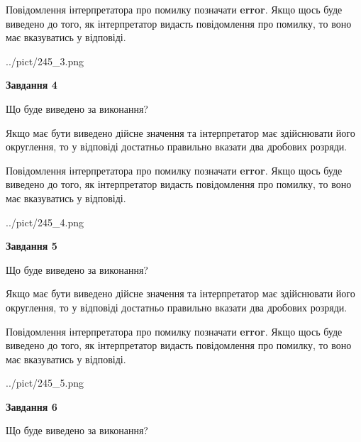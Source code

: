 \documentclass[12pt, ukrainian]{article}
\begin{document}
{\begin {Large}
Повідомлення інтерпретатора про помилку позначати \textbf{error}.
Якщо щось буде виведено до того, як інтерпретатор видасть повідомлення про помилку, 
то воно має вказуватись у відповіді. \par

\begin{center}
	{../pict/245_3.png}
\end{center}
\newpage

{\begin {center}\textbf{Завдання 4}\end {center}}\par
Що буде виведено за виконання? \par

Якщо має бути виведено дійсне значення та інтерпретатор має здійснювати його округлення, 
то у відповіді достатньо правильно вказати два дробових розряди.

Повідомлення інтерпретатора про помилку позначати \textbf{error}.
Якщо щось буде виведено до того, як інтерпретатор видасть повідомлення про помилку, 
то воно має вказуватись у відповіді. \par

\begin{center}
	{../pict/245_4.png}
\end{center}
\newpage

{\begin {center}\textbf{Завдання 5}\end {center}}\par
Що буде виведено за виконання? \par

Якщо має бути виведено дійсне значення та інтерпретатор має здійснювати його округлення, 
то у відповіді достатньо правильно вказати два дробових розряди.

Повідомлення інтерпретатора про помилку позначати \textbf{error}.
Якщо щось буде виведено до того, як інтерпретатор видасть повідомлення про помилку, 
то воно має вказуватись у відповіді. \par

\begin{center}
	{../pict/245_5.png}
\end{center}
\newpage

{\begin {center}\textbf{Завдання 6}\end {center}}\par
Що буде виведено за виконання? \par


\end{Large}}
\end{document}
